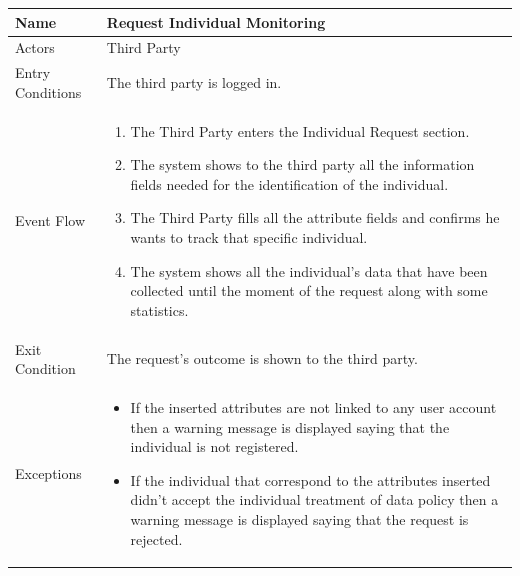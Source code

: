 \begin{enumerate}
\FloatBarrier
\begin{table}[h]
\begin{tabular}{|l|p{}|}
\hline
Name             & Request Individual Monitoring \\ \hline
Actors           & Third Party  \\ \hline
Entry Conditions & The third party is logged in.    \\ \hline
Event Flow       & \begin{enumerate}
            \item The Third Party enters the Individual Request section.         
            \item The system shows to the third party all the information fields needed for the identification of the individual.
            \item The Third Party fills all the attribute fields and confirms he wants to track that specific individual.
            \item The system shows all the individual's data that have been collected until the moment of the request along with some statistics. 
        \end{enumerate}\\ \hline
Exit Condition   & The request's outcome is shown to the third party.\\ \hline
Exceptions       & \begin{itemize}
\item If the inserted attributes are not linked to any user account then a warning message is displayed saying that the individual is not registered.
\item If the individual that correspond to the attributes inserted didn't accept the individual treatment of data policy then a warning message is displayed saying that the request is rejected.
\end{itemize}\\ \hline
\end{tabular}
\end{table}
\FloatBarrier


\end{enumerate}
